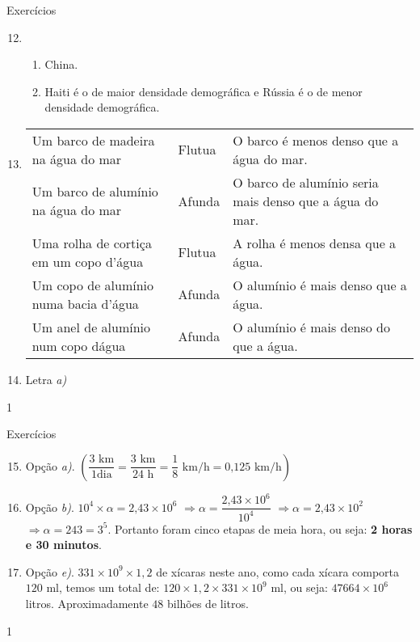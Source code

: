 \begin{answer}{Exercícios}
{\exerciselist
\begin{enumerate}\setcounter{enumi}{11}
\item 
\begin{enumerate}
\item China.

\item Haiti é o de maior densidade demográfica e Rússia é o de menor densidade demográfica.
\end{enumerate}

\item 
{}
{
\begin{tabular}{|e{.35\linewidth}|e{.15\linewidth}|e{.35\linewidth}|}
\hline
{} &  &  \tabularnewline
\hline
Um barco de madeira na água do mar & Flutua & O barco é menos denso que a água do mar. \tabularnewline
\hline
Um barco de alumínio na água do mar & Afunda & O barco de alumínio seria mais denso que a água do mar. \tabularnewline
\hline
Uma rolha de cortiça em um copo d’água & Flutua & A rolha é menos densa que a água. \tabularnewline
\hline
Um copo de alumínio numa bacia d’água & Afunda & O alumínio é mais denso que a água. \tabularnewline
\hline
Um anel de alumínio num copo dágua & Afunda & O alumínio é mais denso do que a água. \tabularnewline
\hline
\end{tabular}
}

\item Letra \textit{a)}
\end{enumerate}
}{1}
\end{answer}
\clearmargin

\begin{answer}{Exercícios}
{\exerciselist
\begin{enumerate}\setcounter{enumi}{14}
\item Opção \textit{a)}.  \(\left(\dfrac{3\text{ km}}{1\text{dia}}=\dfrac{3\text{ km}}{24\text{ h}}=\dfrac{1}{8}\text{ km/h} =0\text{,}125\text{ km/h}\right)\)

\item Opção \textit{b)}. \(10^{4} \times \alpha = 2\text{,}43 \times 10^{6}\) \(\Rightarrow \alpha = \dfrac{2\text{,}43 \times 10^{6}}{10^{4}}\) \(\Rightarrow \alpha = 2\text{,}43 \times 10^{2}\) \(\Rightarrow \alpha = 243 = 3^{5}\). Portanto foram cinco etapas de meia hora, ou seja: \textbf{2 horas e 30 minutos}.

\item Opção \textit{e)}. \(331 \times 10^{9} \times 1,2\) de xícaras neste ano, como cada xícara comporta \(120\) ml, temos um total de: \(120 \times 1,2 \times 331 \times 10^{9}\) ml, ou seja: \(47664 \times 10^{6}\) litros. Aproximadamente \(48\) bilhões de litros.
\end{enumerate}
}{1}
\end{answer}
\clearmargin


